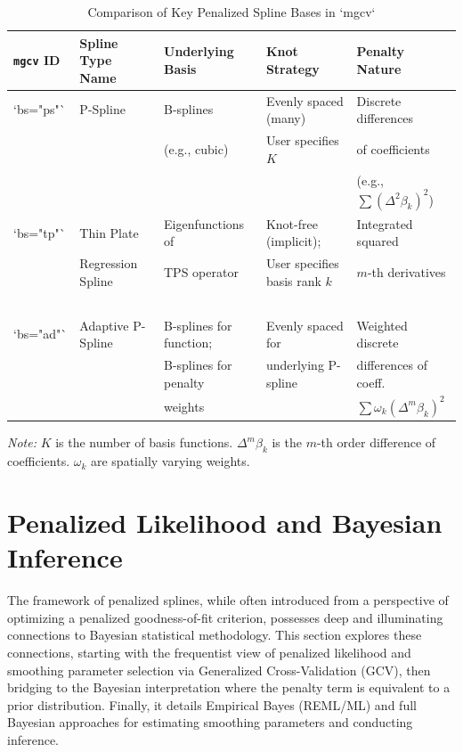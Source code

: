 \documentclass[11pt, a4paper]{article}
\begin{document}
\begin{itemize}
\vspace{1em}
\begin{table}[h!]
\centering
\caption{Comparison of Key Penalized Spline Bases in `mgcv`}
\label{tab:spline_comparison}
\begin{tabular}{@{}lllll@{}}
\toprule
\textbf{\texttt{mgcv} ID} & \textbf{Spline Type Name} & \textbf{Underlying Basis} & \textbf{Knot Strategy} & \textbf{Penalty Nature} \\
\midrule
`bs="ps"` & P-Spline & B-splines & Evenly spaced (many) & Discrete differences \\
& & (e.g., cubic) & User specifies $K$ & of coefficients \\
& & & & (e.g., $\sum (\Delta^2 \beta_k)^2$) \\
\addlinespace
`bs="tp"` & Thin Plate & Eigenfunctions of & Knot-free (implicit); & Integrated squared \\
& Regression Spline & TPS operator & User specifies basis rank $k$ & $m$-th derivatives \\
& & & &  \\
\addlinespace
`bs="ad"` & Adaptive P-Spline & B-splines for function; & Evenly spaced for & Weighted discrete \\
& & B-splines for penalty & underlying P-spline & differences of coeff. \\
& & weights & & $\sum \omega_k (\Delta^m \beta_k)^2$ \\
\bottomrule
\end{tabular}
\par
\vspace{0.5em}
\textit{Note:} $K$ is the number of basis functions. $\Delta^m \beta_k$ is the $m$-th order difference of coefficients. $\omega_k$ are spatially varying weights.
\end{table}

\newpage
\section{Penalized Likelihood and Bayesian Inference}
The framework of penalized splines, while often introduced from a perspective of optimizing a penalized goodness-of-fit criterion, possesses deep and illuminating connections to Bayesian statistical methodology. This section explores these connections, starting with the frequentist view of penalized likelihood and smoothing parameter selection via Generalized Cross-Validation (GCV), then bridging to the Bayesian interpretation where the penalty term is equivalent to a prior distribution. Finally, it details Empirical Bayes (REML/ML) and full Bayesian approaches for estimating smoothing parameters and conducting inference.


\end{itemize}
\end{document}
